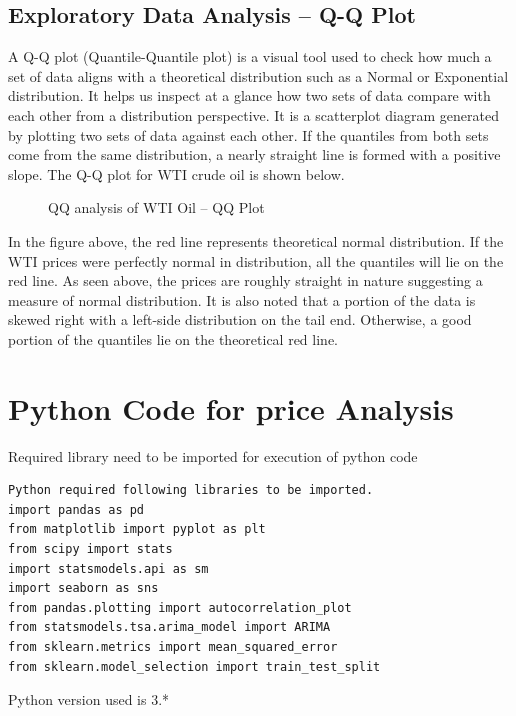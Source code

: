 \documentclass[a4paper,10pt]{article}
\begin{document}
\subsection{Exploratory Data Analysis – Q-Q Plot}
A Q-Q plot (Quantile-Quantile plot) is a visual tool used to check how much a set of data aligns with a theoretical distribution such as a Normal or Exponential distribution. It helps us inspect at a glance how two sets of data compare with each other from a distribution perspective. It is a scatterplot diagram generated by plotting two sets of data against each other. If the quantiles from both sets come from the same distribution, a nearly straight line is formed with a positive slope.\cite{cla2015}
The Q-Q plot for WTI crude oil is shown below.
\begin{figure}[!ht]
    \centering
	\noindent{}
	\caption[Oil Price]{QQ analysis of WTI Oil – QQ Plot}
    \label{fig:oilprice8}
\end{figure}
In the figure above, the red line represents theoretical normal distribution. If the WTI prices were perfectly normal in distribution, all the quantiles will lie on the red line. As seen above, the prices are roughly straight in nature suggesting a measure of normal distribution. It is also noted that a portion of the data is skewed right with a left-side distribution on the tail end. Otherwise, a good portion of the quantiles lie on the theoretical red line.
\section{Python Code for price Analysis}
\lstset{language=Python}
Required library need to be imported for execution of python code
\begin{lstlisting}
Python required following libraries to be imported.
import pandas as pd
from matplotlib import pyplot as plt
from scipy import stats
import statsmodels.api as sm
import seaborn as sns
from pandas.plotting import autocorrelation_plot
from statsmodels.tsa.arima_model import ARIMA
from sklearn.metrics import mean_squared_error
from sklearn.model_selection import train_test_split
\end{lstlisting}
Python version used is 3.*
\end{document}
